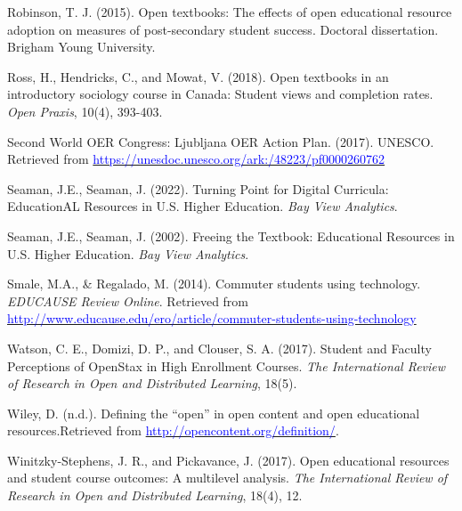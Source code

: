 \documentclass[11pt]{article}
\newcommand{\alink}[2]{\href{#1}{\textcolor{blue}{#2}}}
\begin{document}
\begin{thebibliography}{99}
   Robinson, T. J. (2015). Open textbooks: The effects of open educational resource adoption on measures of post-secondary student success. Doctoral dissertation. Brigham Young University.

   Ross, H., Hendricks, C., and Mowat, V. (2018). Open textbooks in an introductory sociology course in Canada: Student views and completion rates. {\em Open Praxis}, 10(4), 393-403.

   Second World OER Congress: Ljubljana OER Action Plan. (2017). UNESCO. \newline Retrieved from \alink{https://unesdoc.unesco.org/ark:/48223/pf0000260762}{https://unesdoc.unesco.org/ark:/48223/pf0000260762}

   Seaman, J.E., Seaman, J. (2022). Turning Point for Digital Curricula: EducationAL Resources in U.S. Higher Education. {\em Bay View Analytics}.%

   Seaman, J.E., Seaman, J. (2002). Freeing the Textbook: Educational Resources in U.S. Higher Education. {\em Bay View Analytics}. %

   Smale, M.A., \& Regalado, M. (2014). Commuter students using technology. {\em EDUCAUSE Review Online}. Retrieved from \alink{http://www.educause.edu/ero/article/commuter-students-using-technology}{http://www.educause.edu/ero/article/commuter-students-using-technology}  

   Watson, C. E., Domizi, D. P., and Clouser, S. A. (2017). Student and Faculty Perceptions of OpenStax in High Enrollment Courses. {\em The International Review of Research in Open and Distributed Learning}, 18(5). %

   Wiley, D. (n.d.). Defining the ``open'' in open content and open educational resources.\newline Retrieved from \alink{http://opencontent.org/definition/}{http://opencontent.org/definition/}.

   Winitzky-Stephens, J. R., and Pickavance, J. (2017). Open educational resources and student course outcomes: A multilevel analysis. {\em The International Review of Research in Open and Distributed Learning}, 18(4), 12.

\end{thebibliography}
\end{document}
